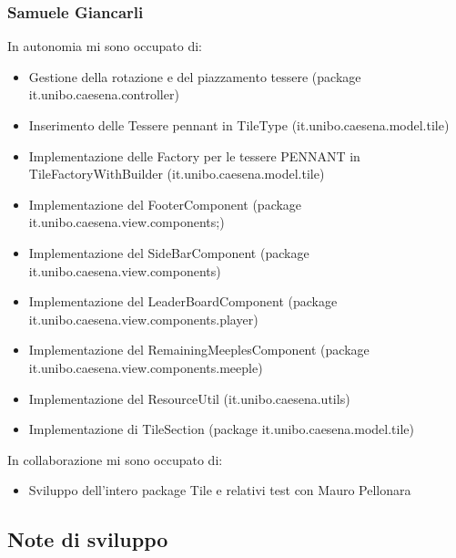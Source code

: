 \subsubsection*{Samuele Giancarli}
In autonomia mi sono occupato di:
\begin{itemize}
    \item Gestione della rotazione e del piazzamento tessere (package it.unibo.caesena.controller) 
    \item Inserimento delle Tessere pennant in TileType (it.unibo.caesena.model.tile)
    \item Implementazione delle Factory per le tessere PENNANT in TileFactoryWithBuilder (it.unibo.caesena.model.tile)
    \item Implementazione del FooterComponent (package it.unibo.caesena.view.components;)
    \item Implementazione del SideBarComponent (package it.unibo.caesena.view.components)
    \item Implementazione del LeaderBoardComponent (package it.unibo.caesena.view.components.player)
    \item Implementazione del RemainingMeeplesComponent (package it.unibo.caesena.view.components.meeple)
    \item Implementazione del ResourceUtil (it.unibo.caesena.utils)
    \item Implementazione di TileSection (package it.unibo.caesena.model.tile)
\end{itemize}

In collaborazione mi sono occupato di:
\begin{itemize}
    \item Sviluppo dell'intero package Tile e relativi test con Mauro Pellonara
\end{itemize}

\subsection{Note di sviluppo}
